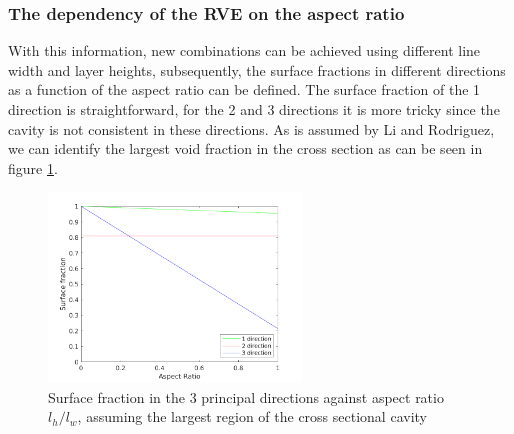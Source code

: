 \subsubsection{The dependency of the RVE on the aspect ratio}
With this information, new combinations can be achieved using different line width and layer heights, subsequently, the surface fractions in different directions as a function of the aspect ratio can be defined. The surface fraction of the 1 direction is straightforward, for the 2 and 3 directions it is more tricky since the cavity is not consistent in these directions. As is assumed by Li and Rodriguez, we can identify the largest void fraction in the cross section as can be seen in figure \ref{fig:Surfacefraction}.

\begin{figure}[H]
    \centering
    \includegraphics[width=0.6\textwidth]{chapter_4_RVE_Definition/figures/Surfacefraction.png}
    \caption{Surface fraction in the 3 principal directions against aspect ratio $l_h/l_w$, assuming the largest region of the cross sectional cavity }
    \label{fig:Surfacefraction}
\end{figure}

